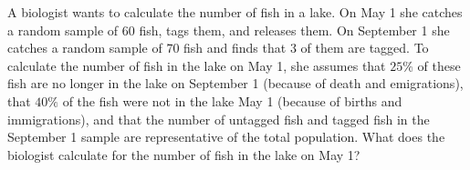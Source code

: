 A biologist wants to calculate the number of fish in a lake. On May 1 she catches a random sample of 60 fish, tags them, and releases them. On September 1 she catches a random sample of 70 fish and finds that 3 of them are tagged. To calculate the number of fish in the lake on May 1, she assumes that $25\%$ of these fish are no longer in the lake on September 1 (because of death and emigrations), that $40\%$ of the fish were not in the lake May 1 (because of births and immigrations), and that the number of untagged fish and tagged fish in the September 1 sample are representative of the total population. What does the biologist calculate for the number of fish in the lake on May 1?